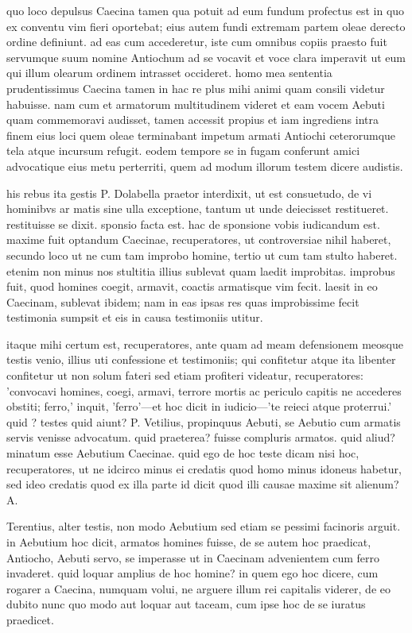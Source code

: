  quo loco depulsus Caecina tamen qua potuit ad eum fundum profectus est in quo ex conventu vim fieri oportebat; eius autem fundi extremam partem oleae derecto ordine definiunt. ad eas cum accederetur, iste cum omnibus copiis praesto fuit servumque suum nomine Antiochum ad se vocavit et voce clara imperavit ut eum qui illum olearum ordinem intrasset occideret. homo mea sententia prudentissimus Caecina tamen in hac re plus mihi animi quam consili videtur habuisse. nam cum et armatorum multitudinem videret et eam vocem Aebuti quam commemoravi audisset, tamen accessit propius et iam ingrediens intra finem eius loci quem oleae terminabant impetum armati Antiochi ceterorumque tela atque incursum refugit. eodem tempore se in fugam conferunt amici advocatique eius metu perterriti, quem ad modum illorum testem dicere audistis.

 his rebus ita gestis P. Dolabella praetor interdixit, ut est consuetudo, de vi hominibvs ar matis sine ulla exceptione, tantum ut unde deiecisset restitueret. restituisse se dixit. sponsio facta est. hac de sponsione vobis iudicandum est. maxime fuit optandum Caecinae, recuperatores, ut controversiae nihil haberet, secundo loco ut ne cum tam improbo homine, tertio ut cum tam stulto haberet. etenim non minus nos stultitia illius sublevat quam laedit improbitas. improbus fuit, quod homines coegit, armavit, coactis armatisque vim fecit. laesit in eo Caecinam, sublevat ibidem; nam in eas ipsas res quas improbissime fecit testimonia sumpsit et eis in causa testimoniis utitur.

 itaque mihi certum est, recuperatores, ante quam ad meam defensionem meosque testis venio, illius uti confessione et testimoniis; qui confitetur atque ita libenter confitetur ut non solum fateri sed etiam profiteri videatur, recuperatores: 'convocavi homines, coegi, armavi, terrore mortis ac periculo capitis ne accederes obstiti; ferro,' inquit, 'ferro'—et hoc dicit in iudicio—'te reieci atque proterrui.' quid ? testes quid aiunt? P. Vetilius, propinquus Aebuti, se Aebutio cum armatis servis venisse advocatum. quid praeterea? fuisse compluris armatos. quid aliud? minatum esse Aebutium Caecinae. quid ego de hoc teste dicam nisi hoc, recuperatores, ut ne idcirco minus ei credatis quod homo minus idoneus habetur, sed ideo credatis quod ex illa parte id dicit quod illi causae maxime sit alienum? A.

 Terentius, alter testis, non modo Aebutium sed etiam se pessimi facinoris arguit. in Aebutium hoc dicit, armatos homines fuisse, de se autem hoc praedicat, Antiocho, Aebuti servo, se imperasse ut in Caecinam advenientem cum ferro invaderet. quid loquar amplius de hoc homine? in quem ego hoc dicere, cum rogarer a Caecina, numquam volui, ne arguere illum rei capitalis viderer, de eo dubito nunc quo modo aut loquar aut taceam, cum ipse hoc de se iuratus praedicet.

